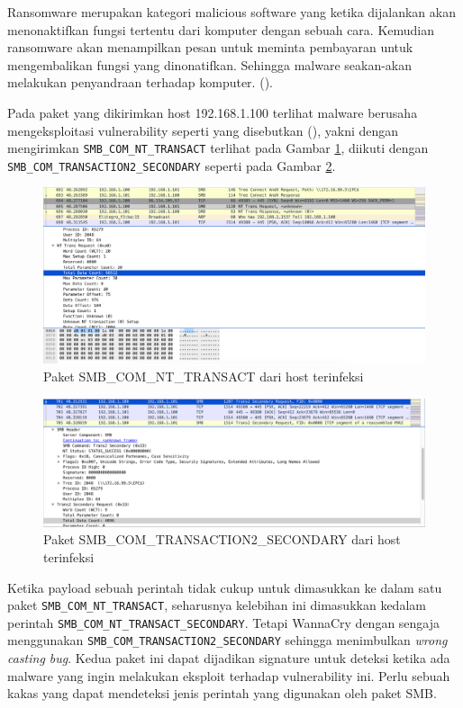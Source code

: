 Ransomware merupakan kategori malicious software yang ketika dijalankan akan menonaktifkan fungsi tertentu dari komputer dengan sebuah cara. Kemudian ransomware akan menampilkan pesan untuk meminta pembayaran untuk mengembalikan fungsi yang dinonatifkan. Sehingga malware seakan-akan melakukan penyandraan terhadap komputer. (\cite{o2012ransomware}).

Pada paket yang dikirimkan host 192.168.1.100 terlihat malware berusaha mengeksploitasi vulnerability seperti yang disebutkan (\cite{islam2018smb}), yakni dengan mengirimkan \verb|SMB_COM_NT_TRANSACT| terlihat pada Gambar \ref{fig:trans_nop}, diikuti dengan \verb|SMB_COM_TRANSACTION2_SECONDARY| seperti pada Gambar \ref{fig:trans2_secondary}.

\begin{figure}[H]
	\centering
	\includegraphics[width=\textwidth]{resources/trans_nop.png}
	\caption{Paket SMB\_COM\_NT\_TRANSACT dari host terinfeksi}
	\label{fig:trans_nop}
\end{figure}
\begin{figure}[H]
	\centering
	\includegraphics[width=\textwidth]{resources/trans2_secondary.png}
	\caption{Paket SMB\_COM\_TRANSACTION2\_SECONDARY dari host terinfeksi}
	\label{fig:trans2_secondary}
\end{figure}

Ketika payload sebuah perintah tidak cukup untuk dimasukkan ke dalam satu paket \verb|SMB_COM_NT_TRANSACT|, seharusnya kelebihan ini dimasukkan kedalam perintah \verb|SMB_COM_NT_TRANSACT_SECONDARY|. Tetapi WannaCry dengan sengaja menggunakan \verb|SMB_COM_TRANSACTION2_SECONDARY| sehingga menimbulkan \textit{wrong casting bug}. Kedua paket ini dapat dijadikan signature untuk deteksi ketika ada malware yang ingin melakukan eksploit terhadap vulnerability ini. Perlu sebuah kakas yang dapat mendeteksi jenis perintah yang digunakan oleh paket SMB.


